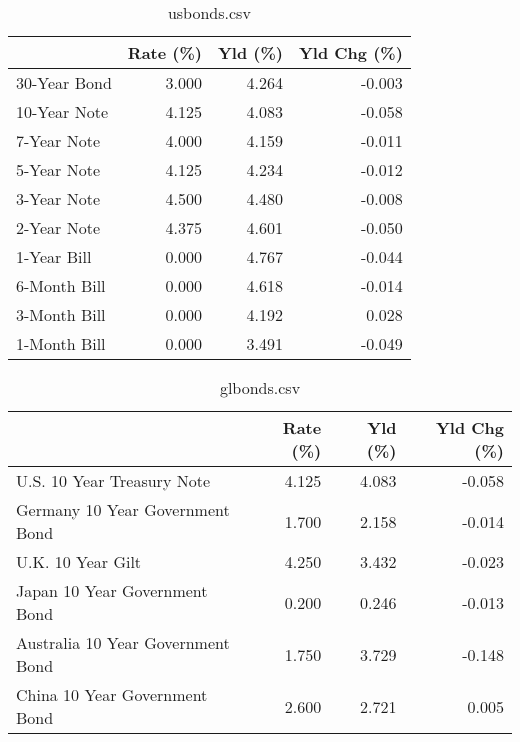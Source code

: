 \documentclass{article}%
\begin{document}
%


\begin{table}[htbp]%
\caption{usbonds.csv}%
\centering%
\begin{adjustbox}{width=1\textwidth}%
\begin{tabular}{lrrr}
\toprule
             &  Rate (\%) &  Yld (\%) &  Yld Chg (\%) \\
\midrule
30-Year Bond &     3.000 &    4.264 &       -0.003 \\
10-Year Note &     4.125 &    4.083 &       -0.058 \\
 7-Year Note &     4.000 &    4.159 &       -0.011 \\
 5-Year Note &     4.125 &    4.234 &       -0.012 \\
 3-Year Note &     4.500 &    4.480 &       -0.008 \\
 2-Year Note &     4.375 &    4.601 &       -0.050 \\
 1-Year Bill &     0.000 &    4.767 &       -0.044 \\
6-Month Bill &     0.000 &    4.618 &       -0.014 \\
3-Month Bill &     0.000 &    4.192 &        0.028 \\
1-Month Bill &     0.000 &    3.491 &       -0.049 \\
\bottomrule
\end{tabular}
%
\end{adjustbox}%
\end{table}

%


\begin{table}[htbp]%
\caption{glbonds.csv}%
\centering%
\begin{adjustbox}{width=1\textwidth}%
\begin{tabular}{lrrr}
\toprule
                                  &  Rate (\%) &  Yld (\%) &  Yld Chg (\%) \\
\midrule
       U.S. 10 Year Treasury Note &     4.125 &    4.083 &       -0.058 \\
  Germany 10 Year Government Bond &     1.700 &    2.158 &       -0.014 \\
                U.K. 10 Year Gilt &     4.250 &    3.432 &       -0.023 \\
    Japan 10 Year Government Bond &     0.200 &    0.246 &       -0.013 \\
Australia 10 Year Government Bond &     1.750 &    3.729 &       -0.148 \\
    China 10 Year Government Bond &     2.600 &    2.721 &        0.005 \\
\bottomrule
\end{tabular}
%
\end{adjustbox}%
\end{table}
\end{document}
